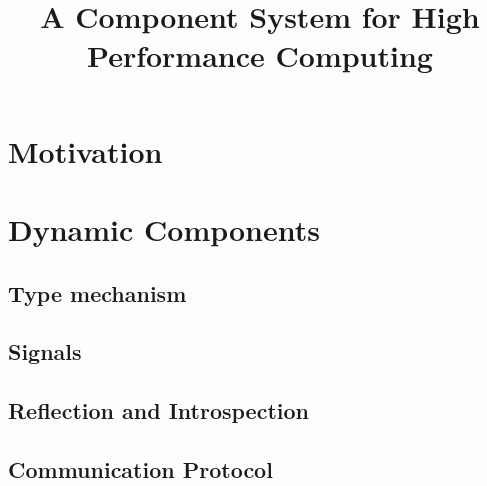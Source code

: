 \documentclass[12pt]{scrartcl}
\title{A Component System for High Performance Computing}
\author{}
\begin{document}
\maketitle

\tableofcontents


\section{Motivation} 



\section{Dynamic Components} 


\subsection{Type mechanism}





\subsection{Signals}


\subsection{Reflection and Introspection}

\subsection{Communication Protocol} 




\end{document}
